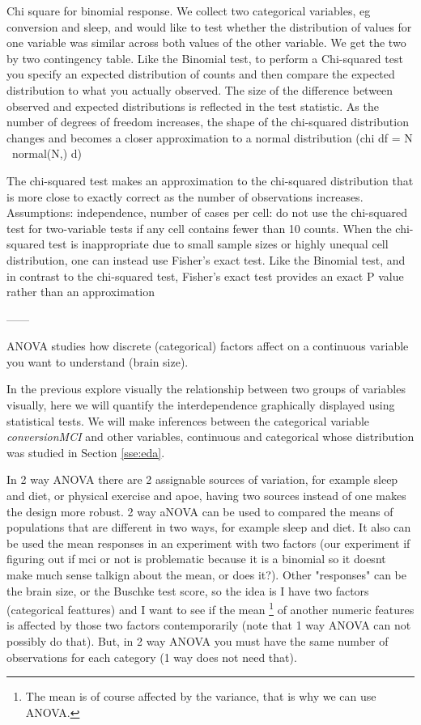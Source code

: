 \documentclass[11pt]{article}
\theoremstyle{definition}
\theoremstyle{remark}
\begin{document}
Chi square for binomial response.
We collect two categorical variables, eg conversion and sleep, and would like to test whether the distribution of values for one variable was similar across both values of the other variable. We get the two by two contingency table. Like the Binomial test, to perform a Chi-squared test you specify an expected distribution of counts and then compare the expected distribution to what you actually observed. The size of the difference between observed and expected distributions is reflected in the test statistic.
As the number of degrees of freedom increases, the shape of the chi-squared distribution changes and becomes a closer approximation to a normal distribution (chi df = N ~normal(N,) d)

The chi-squared test makes an approximation to the chi-squared distribution that is more close to exactly correct as the number of observations increases. Assumptions: independence, number of cases per cell: do not use the chi-squared test for two-variable tests if any cell contains fewer than 10 counts. When the chi-squared test is inappropriate due to small sample sizes or highly unequal cell distribution, one can instead use Fisher’s exact test.
Like the Binomial test, and in contrast to the chi-squared test, Fisher’s exact test provides an exact P value rather than an approximation

------

ANOVA studies how discrete (categorical) factors affect on a continuous variable you want to understand (brain size).

In the previous explore visually the relationship between two groups of variables visually, here we will quantify the interdependence graphically displayed using statistical tests. We will make inferences between the categorical variable \emph{conversionMCI} and other variables, continuous and categorical whose distribution was studied in Section \ref{sse:eda}.

In 2 way ANOVA there are 2 assignable sources of variation, for example sleep and diet, or physical exercise and apoe, having two sources instead of one makes the design more robust. 2 way aNOVA can be used to compared the means of populations that are different in two ways, for example sleep and diet. It also can be used the mean responses in an experiment with two factors (our experiment if figuring out if mci or not is problematic because it is a binomial so it doesnt make much sense talkign about the mean, or does it?). Other "responses" can be the brain size, or the Buschke test score, so the idea is I have two factors (categorical feattures) and I want to see if the mean \footnote{ The mean is of course affected by the variance, that is why we can use ANOVA. } of another numeric features is affected by those two factors contemporarily (note that 1 way ANOVA can not possibly do that). But, in 2 way ANOVA you must have the same number of observations for each category (1 way does not need that). 
\end{document}
